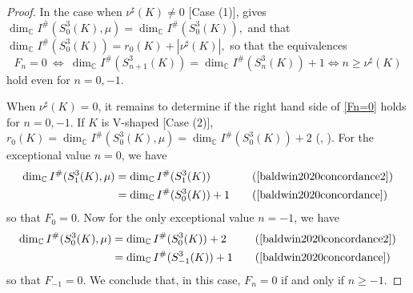 \documentclass[11pt]{amsart}
\begin{document}
\begin{proof}
In the case when $\nu^{\sharp}(K)\neq 0$ [Case (1)], \cite[Theorem 1.13]{baldwin2020concordance2} gives $\dim_{\mathbb{C}}I^{\#}(S^3_{0}(K),\mu) = \dim_{\mathbb{C}}I^{\#}(S^3_{0}(K)),$ and \cite[Theorem 3.7]{baldwin2020concordance} that $\dim_{\mathbb{C}}I^{\#}(S^3_{0}(K))=r_0(K)+|\nu^\sharp(K)|,$ so that the equivalences
	\[
		F_n = 0~\Leftrightarrow~ \dim_{\mathbb{C}}I^{\#}(S^3_{n+1}(K)) = \dim_{\mathbb{C}}I^{\#}(S^3_{n}(K)) + 1 \Leftrightarrow n\geq \nu^{\sharp}(K)
	\]
hold even for $n=0,-1$.

When $\nu^{\sharp}(K) = 0$, it remains to determine if the right hand side of \eqref{Fn=0} holds for $n=0,-1$. If $K$ is V-shaped [Case (2)], $r_0(K)= \dim_{\mathbb{C}}I^{\#}(S^3_{0}(K),\mu)=\dim_{\mathbb{C}}I^{\#}(S^3_{0}(K))+2$ (\cite[Definition 3.6]{baldwin2020concordance}, \cite[Theorem 1.13]{baldwin2020concordance2}). For the exceptional value $n=0$, we have  
\[
		\begin{aligned}
			\dim_{\mathbb{C}}I^{\#}(S^3_{1}(K),\mu)&=\dim_{\mathbb{C}}I^{\#}(S^3_{1}(K)) &&\quad\text{(\cite[Theorem 1.12]{baldwin2020concordance2})}\\
			&= \dim_{\mathbb{C}}I^{\#}(S^3_{0}(K)) + 1 &&\quad\text{(\cite[Theorem 3.7]{baldwin2020concordance})}
		\end{aligned}
	\]	
so that $F_0=0$. Now for the only exceptional value $n=-1$, we have
	\[
		\begin{aligned}
			\dim_{\mathbb{C}}I^{\#}(S^3_{0}(K),\mu) &= \dim_{\mathbb{C}}I^{\#}(S^3_{0}(K)) + 2 &&\quad\text{(\cite[Theorem 1.13]{baldwin2020concordance2})}\\
			&= \dim_{\mathbb{C}}I^{\#}(S^3_{-1}(K)) + 1 &&\quad\text{(\cite[Theorem 3.7]{baldwin2020concordance})}
		\end{aligned}
	\]
so that $F_{-1}=0$. We conclude that, in this case, $F_n=0$ if and only if $n\geq -1$.
	

\end{proof}
\end{document}
